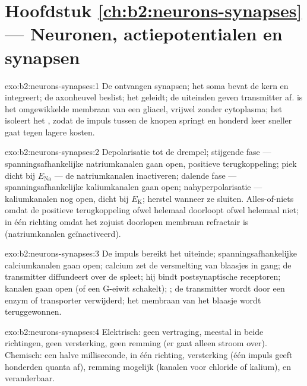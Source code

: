 \section*{Hoofdstuk \ref{ch:b2:neurons-synapses} --- Neuronen, actiepotentialen en synapsen}

\begin{solution}{exo:b2:neurons-synapses:1}
De  ontvangen synapsen; het soma bevat de kern en integreert; de
axonheuvel beslist; het  geleidt; de uiteinden geven transmitter af.
 is het omgewikkelde membraan van een gliacel, vrijwel zonder
cytoplasma; het isoleert het , zodat de impuls tussen de knopen springt
en honderd keer sneller gaat tegen lagere kosten.
\end{solution}

\begin{solution}{exo:b2:neurons-synapses:2}
Depolarisatie tot de drempel; stijgende fase --- spanningsafhankelijke
natriumkanalen gaan open, positieve terugkoppeling; piek dicht bij
$E_{\mathrm{Na}}$ --- de natriumkanalen inactiveren; dalende fase ---
spanningsafhankelijke kaliumkanalen gaan open; nahyperpolarisatie
--- kaliumkanalen nog open, dicht bij
$E_{\mathrm K}$; herstel wanneer ze sluiten. Alles-of-niets omdat de
positieve terugkoppeling ofwel helemaal doorloopt ofwel helemaal niet; in één
richting omdat het zojuist doorlopen membraan refractair is (natriumkanalen
geïnactiveerd).
\end{solution}

\begin{solution}{exo:b2:neurons-synapses:3}
De impuls bereikt het uiteinde; spanningsafhankelijke calciumkanalen gaan
open; calcium zet de versmelting van blaasjes in gang; de transmitter
diffundeert over de spleet; hij bindt postsynaptische receptoren; kanalen
gaan open (of een G-eiwit schakelt); ; de
transmitter wordt door een enzym of transporter verwijderd; het membraan van
het blaasje wordt teruggewonnen.
\end{solution}

\begin{solution}{exo:b2:neurons-synapses:4}
Elektrisch: geen vertraging, meestal in beide richtingen, geen versterking,
geen remming (er gaat alleen stroom over). Chemisch: een halve milliseconde,
in één richting, versterking (één impuls geeft honderden quanta af), remming
mogelijk (kanalen voor chloride of kalium), en veranderbaar.
\end{solution}

